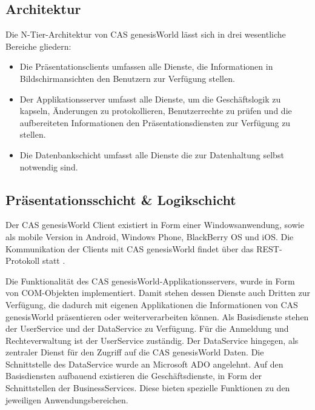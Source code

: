 \subsection{Architektur}

Die N-Tier-Architektur von CAS genesisWorld lässt sich in drei wesentliche Bereiche gliedern:

\begin{itemize}

	\item Die Präsentationsclients umfassen alle Dienste, die Informationen in Bildschirmansichten den Benutzern zur Verfügung stellen.
	
	\item Der Applikationsserver umfasst alle Dienste, um die Geschäftslogik zu kapseln, Änderungen zu protokollieren, Benutzerrechte zu prüfen und die aufbereiteten Informationen den Präsentationsdiensten zur Verfügung zu stellen.
	
	\item Die Datenbankschicht umfasst alle Dienste die zur Datenhaltung selbst notwendig sind.
\end{itemize}


\subsection{Präsentationsschicht \& Logikschicht}

Der CAS genesisWorld Client existiert in Form einer Windowsanwendung, sowie als mobile Version in Android, Windows Phone, BlackBerry OS und iOS. Die Kommunikation der Clients mit CAS genesisWorld findet über das REST-Protokoll statt \cite{cas2013a}.

Die Funktionalität des CAS genesisWorld-Applikationsservers, wurde in Form von COM-Objekten implementiert. Damit stehen dessen Dienste auch Dritten zur Verfügung, die dadurch mit eigenen Applikationen die Informationen von CAS genesisWorld präsentieren oder weiterverarbeiten können. Als Basisdienste stehen der UserService und der DataService zu Verfügung. Für die Anmeldung und Rechteverwaltung ist der UserService zuständig. Der DataService hingegen, als zentraler Dienst für den Zugriff auf die CAS genesisWorld Daten. Die Schnittstelle des DataService wurde an Microsoft ADO angelehnt. Auf den Basisdiensten aufbauend existieren die Geschäftsdienste, in Form der Schnittstellen der BusinessServices. Diese bieten spezielle Funktionen zu den jeweiligen Anwendungsbereichen.

